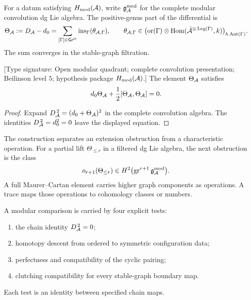For a datum satisfying \(H_{\mathrm{mod}}(\mathcal{A})\), write
\(\mathfrak{g}_{\mathcal{A}}^{\mathrm{mod}}\) for the complete modular convolution dg
Lie algebra.  The positive-genus part of the differential is
\begin{equation}\label{eq:preface-theta}
 \Theta_{\mathcal{A}}:=D_{\mathcal{A}}-d_0
 =\sum_{[\Gamma]\in\mathsf{Gr}^{\mathrm{st}}}
   \operatorname{ins}_{\Gamma}(\theta_{\mathcal{A},\Gamma}),
 \qquad
 \theta_{\mathcal{A},\Gamma}\in
 \bigl(\operatorname{or}(\Gamma)\otimes
 \operatorname{Hom}(\bar{\mathcal{A}}^{\otimes\operatorname{Leg}(\Gamma)},k)
 \bigr)_{h\operatorname{Aut}(\Gamma)}.
\end{equation}
The sum converges in the stable-graph filtration.

\begin{proposition}
\label{prop:preface-mc-formal}
\textup{[Type signature: Open modular quadrant; complete convolution
presentation; Beilinson level \(5\); hypothesis package
\(H_{\mathrm{mod}}(\mathcal{A})\).]}
The element \(\Theta_{\mathcal{A}}\) satisfies
\[
 d_0\Theta_{\mathcal{A}}
 +\frac12[\Theta_{\mathcal{A}},\Theta_{\mathcal{A}}]=0.
\]
\end{proposition}

\begin{proof}
Expand \(D_{\mathcal{A}}^{\,2}=(d_0+\Theta_{\mathcal{A}})^2\) in the complete
convolution algebra.  The identities
\(D_{\mathcal{A}}^{\,2}=d_0^2=0\) leave the displayed equation.
\end{proof}

The construction separates an extension obstruction from a
characteristic operation.  For a partial lift
\(\Theta_{\le r}\) in a filtered dg Lie algebra, the next obstruction
is the class
\[
 o_{r+1}(\Theta_{\le r})
 \in H^2\bigl(\operatorname{gr}^{r+1}\mathfrak{g}_{\mathcal{A}}^{\mathrm{mod}}\bigr).
\]
A full Maurer--Cartan element carries higher graph components as
operations.  A trace maps those operations to cohomology classes or
numbers.

\begin{principle}
\label{princ:four-test-interface}
\ClaimStatusDefinitional
A modular comparison is carried by four explicit tests:
\begin{enumerate}[label=\textup{(\roman*)},leftmargin=*]
\item the chain identity \(D_{\mathcal{A}}^{\,2}=0\);
\item homotopy descent from ordered to symmetric configuration data;
\item perfectness and compatibility of the cyclic pairing;
\item clutching compatibility for every stable-graph boundary map.
\end{enumerate}
Each test is an identity between specified chain maps.
\end{principle}

